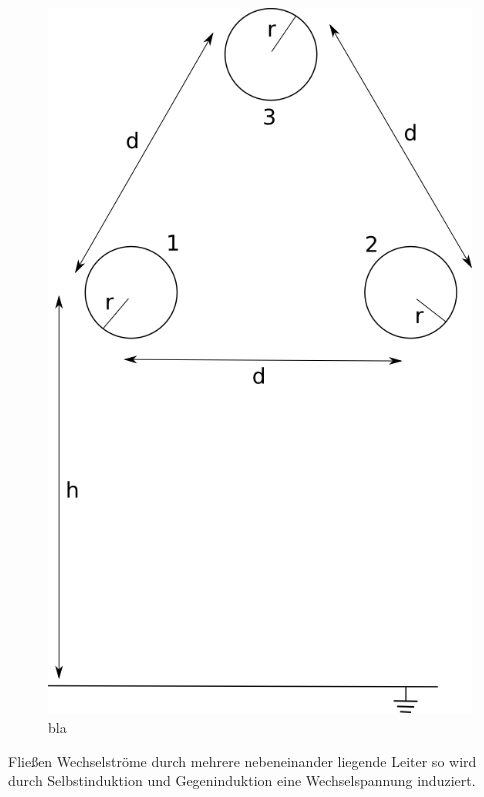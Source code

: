 \begin{figure}[tbhn]
\begin{center}
\noindent
\includegraphics[scale=0.5]{leitungsreaktanz.png}
\end{center}
\caption{bla} %
\label{pic:leitungsreaktanz} 
\end{figure}

Fließen Wechselströme durch mehrere nebeneinander liegende Leiter so wird durch Selbstinduktion und Gegeninduktion eine Wechselspannung induziert.

